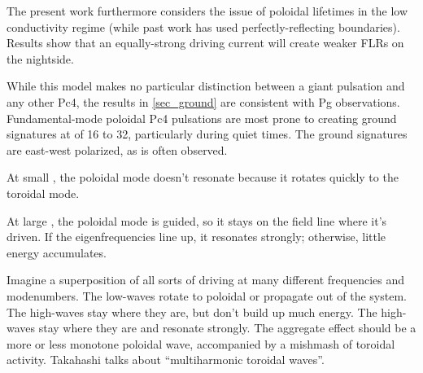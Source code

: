 The present work furthermore considers the issue of poloidal lifetimes in the low conductivity regime (while past work has used perfectly-reflecting boundaries). Results show that an equally-strong driving current will create weaker FLRs on the nightside. 




While this model makes no particular distinction between a giant pulsation and any other Pc4, the results in \cref{sec_ground} are consistent with Pg observations. Fundamental-mode poloidal Pc4 pulsations are most prone to creating ground signatures at \azm of 16 to 32, particularly during quiet times. The ground signatures are east-west polarized, as is often observed. 


At small \azm, the poloidal mode doesn't resonate because it rotates quickly to the toroidal mode. 

At large \azm, the poloidal mode is guided, so it stays on the field line where it's driven. If the eigenfrequencies line up, it resonates strongly; otherwise, little energy accumulates. 

Imagine a superposition of all sorts of driving at many different frequencies and modenumbers. The low-\azm waves rotate to poloidal or propagate out of the system. The high-\azm waves stay where they are, but don't build up much energy. The high-\azm waves stay where they are and resonate strongly. The aggregate effect should be a more or less monotone poloidal wave, accompanied by a mishmash of toroidal activity. Takahashi talks about ``multiharmonic toroidal waves''\cite{takahashi_2011}.




